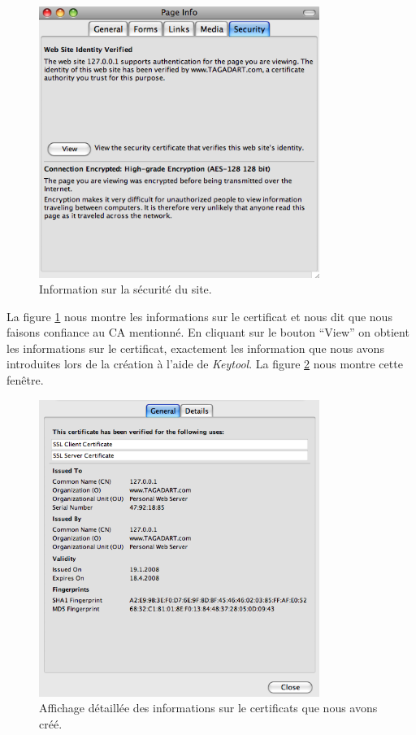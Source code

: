 \documentclass[10pt,a4paper,titlepage]{article}
\begin{document}
\begin{figure}[htbp]
   \begin{center}
      \includegraphics[width=345px]{img/3.png}
   \end{center}
   \caption{Information sur la sécurité du site.}
	\label{fig:infosecu}
\end{figure}

La figure \ref{fig:infosecu} nous montre les informations sur le certificat et nous dit que nous faisons confiance au CA mentionné. En cliquant sur le bouton “View” on obtient les informations sur le certificat, exactement les information que nous avons introduites lors de la création à l'aide de \emph{Keytool}. La figure \ref{fig:certif} nous montre cette fenêtre.

\begin{figure}[htbp]
   \begin{center}
      \includegraphics[width=345px]{img/4.png}
   \end{center}
   \caption{Affichage détaillée des informations sur le certificats que nous avons créé.}
	\label{fig:certif}
\end{figure}
\end{document}
